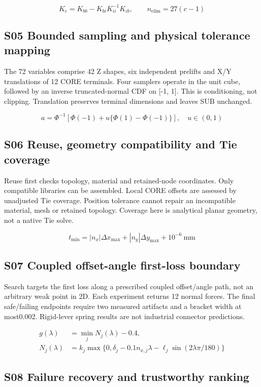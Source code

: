\documentclass[UTF8,a4paper,11pt,fontset=windows]{ctexart}
\begin{document}
\[K_c=K_{bb}-K_{bi}K_{ii}^{-1}K_{ib},\qquad n_{\mathrm{elim}}=27(c-1)\]

\subsection{S05 Bounded sampling and physical tolerance mapping}

The 72 variables comprise 42 Z shapes, six independent prelifts and X/Y translations of 12 CORE terminals. Four samplers operate in the unit cube, followed by an inverse truncated-normal CDF on [-1, 1]. This is conditioning, not clipping. Translation preserves terminal dimensions and leaves SUB unchanged.

\[a=\Phi^{-1}\!\left[\Phi(-1)+u\{\Phi(1)-\Phi(-1)\}\right],\quad u\in(0,1)\]

\subsection{S06 Reuse, geometry compatibility and Tie coverage}

Reuse first checks topology, material and retained-node coordinates. Only compatible libraries can be assembled. Local CORE offsets are assessed by unadjusted Tie coverage. Position tolerance cannot repair an incompatible material, mesh or retained topology. Coverage here is analytical planar geometry, not a native Tie solve.

\[t_{\min}=|n_x|\Delta x_{\max}+|n_y|\Delta y_{\max}+10^{-6}\ \mathrm{mm}\]

\subsection{S07 Coupled offset-angle first-loss boundary}

Search targets the first loss along a prescribed coupled offset/angle path, not an arbitrary weak point in 2D. Each experiment returns 12 normal forces. The final safe/failing endpoints require two measured artifacts and a bracket width at most0.002. Rigid-lever spring results are not industrial connector predictions.

\[\begin{aligned}g(\lambda)&=\min_j N_j(\lambda)-0.4,\\N_j(\lambda)&=k_j\max\{0,\delta_j-0.1n_{x,j}\lambda-\ell_j\sin(2\lambda\pi/180)\}\end{aligned}\]

\subsection{S08 Failure recovery and trustworthy ranking}
\end{document}
